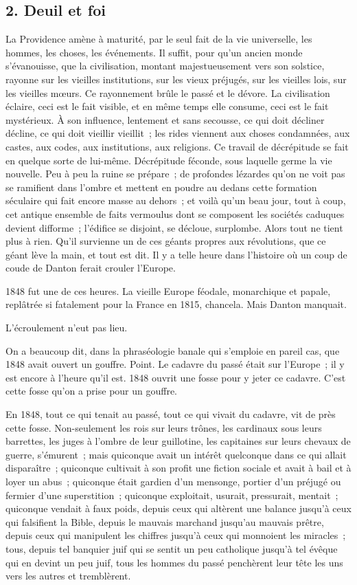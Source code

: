 \documentclass[french,twoside]{book} %
\begin{document}
\subsection[{2. Deuil et foi}]{2. Deuil et foi}
\noindent La Providence amène à maturité, par le seul fait de la vie universelle, les hommes, les choses, les événements. Il suffit, pour qu’un ancien monde s’évanouisse, que la civilisation, montant majestueusement vers son solstice, rayonne sur les vieilles institutions, sur les vieux préjugés, sur les vieilles lois, sur les vieilles mœurs. Ce rayonnement brûle le passé et le dévore. La civilisation éclaire, ceci est le fait visible, et en même temps elle consume, ceci est le fait mystérieux. À son influence, lentement et sans secousse, ce qui doit décliner décline, ce qui doit vieillir vieillit ; les rides viennent aux choses condamnées, aux castes, aux codes, aux institutions, aux religions. Ce travail de décrépitude se fait en quelque sorte de lui-même. Décrépitude féconde, sous laquelle germe la vie nouvelle. Peu à peu la ruine se prépare ; de profondes lézardes qu’on ne voit pas se ramifient dans l’ombre et mettent en poudre au dedans cette formation séculaire qui fait encore masse au dehors ; et voilà qu’un beau jour, tout à coup, cet antique ensemble de faits vermoulus dont se composent les sociétés caduques devient difforme ; l’édifice se disjoint, se décloue, surplombe. Alors tout ne tient plus à rien. Qu’il survienne un de ces géants propres aux révolutions, que ce géant lève la main, et tout est dit. Il y a telle heure dans l’histoire où un coup de coude de Danton ferait crouler l’Europe.\par
1848 fut une de ces heures. La vieille Europe féodale, monarchique et papale, replâtrée si fatalement pour la France en 1815, chancela. Mais Danton manquait.\par
L’écroulement n’eut pas lieu.\par
On a beaucoup dit, dans la phraséologie banale qui s’emploie en pareil cas, que 1848 avait ouvert un gouffre. Point. Le cadavre du passé était sur l’Europe ; il y est encore à l’heure qu’il est. 1848 ouvrit une fosse pour y jeter ce cadavre. C’est cette fosse qu’on a prise pour un gouffre.\par
En 1848, tout ce qui tenait au passé, tout ce qui vivait du cadavre, vit de près cette fosse. Non-seulement les rois sur leurs trônes, les cardinaux sous leurs barrettes, les juges à l’ombre de leur guillotine, les capitaines sur leurs chevaux de guerre, s’émurent ; mais quiconque avait un intérêt quelconque dans ce qui allait disparaître ; quiconque cultivait à son profit une fiction sociale et avait à bail et à loyer un abus ; quiconque était gardien d’un mensonge, portier d’un préjugé ou fermier d’une superstition ; quiconque exploitait, usurait, pressurait, mentait ; quiconque vendait à faux poids, depuis ceux qui altèrent une balance jusqu’à ceux qui falsifient la Bible, depuis le mauvais marchand jusqu’au mauvais prêtre, depuis ceux qui manipulent les chiffres jusqu’à ceux qui monnoient les miracles ; tous, depuis tel banquier juif qui se sentit un peu catholique jusqu’à tel évêque qui en devint un peu juif, tous les hommes du passé penchèrent leur tête les uns vers les autres et tremblèrent.\par
\end{document}
